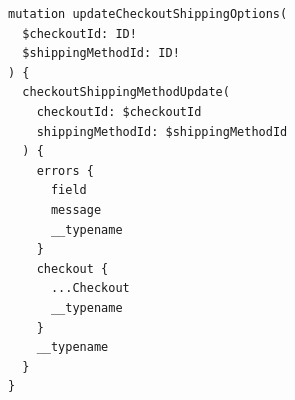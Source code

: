\begin{verbatim}
mutation updateCheckoutShippingOptions(
  $checkoutId: ID!
  $shippingMethodId: ID!
) {
  checkoutShippingMethodUpdate(
    checkoutId: $checkoutId
    shippingMethodId: $shippingMethodId
  ) {
    errors {
      field
      message
      __typename
    }
    checkout {
      ...Checkout
      __typename
    }
    __typename
  }
}
\end{verbatim}